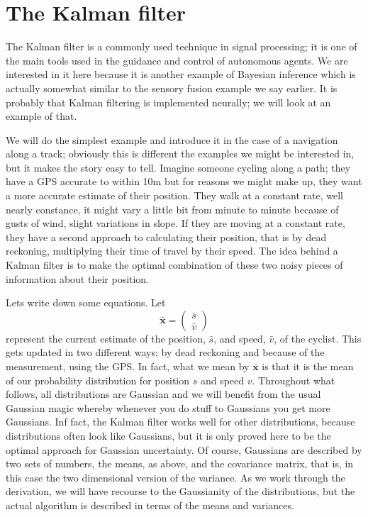 \documentclass[12pt]{article}
\begin{document}
\section*{The Kalman filter}

The Kalman filter is a commonly used technique in signal processing;
it is one of the main tools used in the guidance and control of
autonomous agents. We are interested in it here because it is another
example of Bayesian inference which is actually somewhat similar to
the sensory fusion example we say earlier. It is probably that Kalman
filtering is implemented neurally; we will look at an example of that.

We will do the simplest example and introduce it in the case of a
navigation along a track; obviously this is different the examples we
might be interested in, but it makes the story easy to tell. Imagine
someone cycling along a path; they have a GPS accurate to within 10m
but for reasons we might make up, they want a more accurate estimate
of their position. They walk at a constant rate, well nearly
constance, it might vary a little bit from minute to minute because of
gusts of wind, slight variations in slope. If they are moving at a
constant rate, they have a second approach to calculating their
position, that is by dead reckoning, multiplying their time of travel
by their speed. The idea behind a Kalman filter is to make the optimal
combination of these two noisy pieces of information about their
position.

Lets write down some equations. Let 
\begin{equation}
\mathbf{\bar{x}}=\left(\begin{array}{c}\bar{s}\\\bar{v}\end{array}\right)
\end{equation}
represent the current estimate of the position, $\bar{s}$, and speed,
$\bar{v}$, of the cyclist. This gets updated in two different ways; by
dead reckoning and because of the measurement, using the GPS. In fact,
what we mean by $\mathbf{\bar{x}}$ is that it is the mean of our
probability distribution for position $s$ and speed $v$. Throughout
what follows, all distributions are Gaussian and we will benefit from
the usual Gaussian magic whereby whenever you do stuff to Gaussians
you get more Gaussians. Inf fact, the Kalman filter works well for
other distributions, because distributions often look like Gaussians,
but it is only proved here to be the optimal approach for Gaussian
uncertainty. Of course, Gaussians are described by two sets of
numbers, the means, as above, and the covariance matrix, that is, in
this case the two dimensional version of the variance. As we work
through the derivation, we will have recourse to the Gaussianity of
the distributions, but the actual algorithm is described in terms of
the means and variances.
\end{document}
